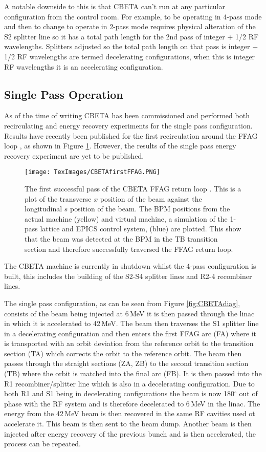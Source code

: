 \documentclass[11pt]{article}
\begin{document}
A notable downside to this is that CBETA can't run at any particular configuration from the control room. For example, to be operating in 4-pass mode and then to change to operate in 2-pass mode requires physical alteration of the S2 splitter line so it has a total path length for the 2nd pass of integer + 1/2 RF wavelengths. Splitters adjusted so the total path length on that pass is integer + 1/2 RF wavelengths are termed decelerating configurations, when this is integer RF wavelengths it is an accelerating configuration.            
     
\subsection{Single Pass Operation}

As of the time of writing CBETA has been commissioned and performed both recirculating and energy recovery experiments for the single pass configuration. Results have recently been published for the first recirculation around the FFAG loop \cite{ColwynIPAC2019}, as shown in Figure \ref{fig:CBETAFFAGpass}. However, the results of the single pass energy recovery experiment are yet to be published.

\begin{figure}[H]
\centering
\texttt{[image: TexImages/CBETAfirstFFAG.PNG]}
\caption{\label{fig:CBETAFFAGpass} The first successful pass of the CBETA FFAG return loop \cite{ColwynIPAC2019}. This is a plot of the transverse $x$ position of the beam against the longitudinal $s$ position of the beam. The BPM positions from the actual machine (yellow) and virtual machine, a simulation of the 1-pass lattice and EPICS control system, (blue) are plotted. This show that the beam was detected at the BPM in the TB transition section and therefore successfully traversed the FFAG return loop.}
\end{figure}
The CBETA machine is currently in shutdown whilst the 4-pass configuration is built, this includes the building of the S2-S4 splitter lines and R2-4 recombiner lines.

The single pass configuration, as can be seen from Figure \ref{fig:CBETAdiag}, consists of the beam being injected at 6\,MeV it is then passed through the linac in which it is accelerated to 42\,MeV. The beam then traverses the S1 splitter line in a decelerating configuration and then enters the first FFAG arc (FA) where it is transported with an orbit deviation from the reference orbit to the transition section (TA) which corrects the orbit to the reference orbit. The beam then passes through the straight sections (ZA, ZB) to the second transition section (TB) where the orbit is matched into the final arc (FB). It is then passed into the R1 recombiner/splitter line which is also in a decelerating configuration. Due to both R1 and S1 being in decelerating configurations the beam is now 180$^{\circ}$ out of phase with the RF system and is therefore decelerated to 6\,MeV in the linac. The energy from the 42\,MeV beam is then recovered in the same RF cavities used ot accelerate it. This beam is then sent to the beam dump. Another beam is then injected after energy recovery of the previous bunch and is then accelerated, the process can be repeated.
\end{document}
